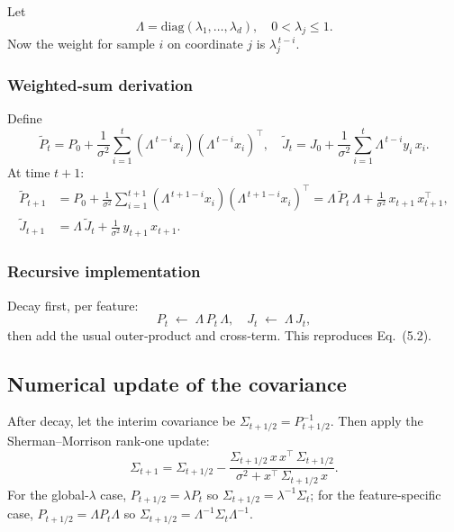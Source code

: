 \documentclass[11pt]{article}
\begin{document}
Let
\[
\Lambda = \mathrm{diag}(\lambda_1,\dots,\lambda_d),\quad 0<\lambda_j\le1.
\]
Now the weight for sample \(i\) on coordinate \(j\) is \(\lambda_j^{\,t-i}\).

\subsubsection{Weighted‐sum derivation}

Define
\begin{equation}\tag{6.4}
\widetilde P_t
= P_0 + \frac{1}{\sigma^2}\sum_{i=1}^t
(\Lambda^{\,t-i}x_i)(\Lambda^{\,t-i}x_i)^\top,
\quad
\widetilde J_t
= J_0 + \frac{1}{\sigma^2}\sum_{i=1}^t
\Lambda^{\,t-i}y_i\,x_i.
\end{equation}
At time \(t+1\):
\begin{align}
\widetilde P_{t+1}
&= P_0 + \frac{1}{\sigma^2}\sum_{i=1}^{t+1}
(\Lambda^{\,t+1-i}x_i)(\Lambda^{\,t+1-i}x_i)^\top
= \Lambda\,\widetilde P_t\,\Lambda + \frac{1}{\sigma^2}\,x_{t+1}\,x_{t+1}^\top,
\tag{6.5}\\
\widetilde J_{t+1}
&= \Lambda\,\widetilde J_t + \frac{1}{\sigma^2}\,y_{t+1}\,x_{t+1}.
\tag{6.6}
\end{align}

\subsubsection{Recursive implementation}

Decay first, per feature:
\[
P_t \;\leftarrow\;\Lambda\,P_t\,\Lambda,
\quad
J_t \;\leftarrow\;\Lambda\,J_t,
\]
then add the usual outer‐product and cross‐term.  This reproduces Eq.~(5.2).

\subsection{Numerical update of the covariance}

After decay, let the interim covariance be
\(\Sigma_{t+1/2} = P_{t+1/2}^{-1}\).  Then apply the Sherman–Morrison rank‐one update:
\begin{equation}\tag{6.7}
\Sigma_{t+1}
= \Sigma_{t+1/2}
- \frac{\Sigma_{t+1/2}\,x\,x^\top\,\Sigma_{t+1/2}}
       {\sigma^2 + x^\top\,\Sigma_{t+1/2}\,x}.
\end{equation}
For the global‐\(\lambda\) case, \(P_{t+1/2}=\lambda P_t\) so \(\Sigma_{t+1/2}=\lambda^{-1}\Sigma_t\); for the feature‐specific case, \(P_{t+1/2}=\Lambda P_t\Lambda\) so \(\Sigma_{t+1/2}=\Lambda^{-1}\Sigma_t\Lambda^{-1}.\)
\end{document}
